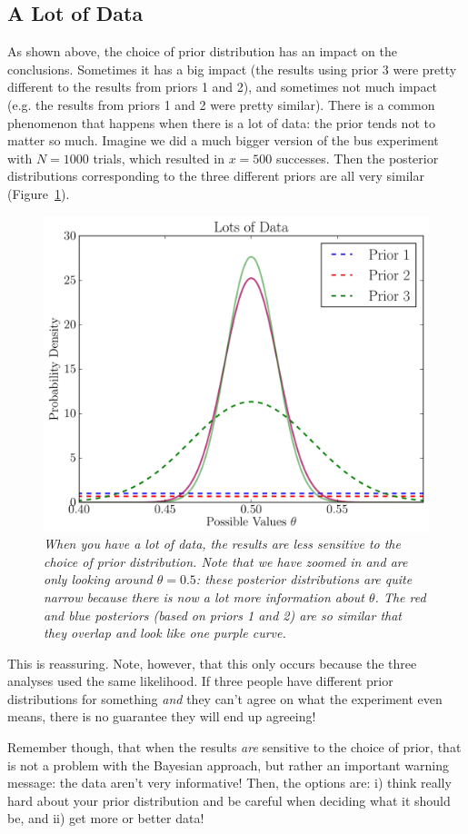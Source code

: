 \subsection{A Lot of Data}
As shown above, the choice of prior distribution has an impact on the conclusions. Sometimes
it has a big impact (the results using prior 3 were pretty different to the results
from priors 1 and 2), and sometimes not much impact (e.g. the results from
priors 1 and 2 were pretty similar). There is a common phenomenon that happens
when there is a lot of data: the prior tends not to matter so much. Imagine
we did a much bigger version of the bus experiment with $N=1000$ trials, which
resulted in $x=500$ successes. Then the posterior distributions corresponding
to the three different priors are all very similar (Figure~\ref{fig:lots_of_data}).

\begin{figure}[ht!]
\begin{center}
\includegraphics[scale=0.6]{Figures/lots_of_data.pdf}
\caption{\it When you have a lot of data, the results are less sensitive
to the choice of prior distribution. Note that we have zoomed in and are only
looking around $\theta=0.5$: these posterior distributions are quite narrow
because there is now a lot more information about $\theta$. The red and blue
posteriors (based on priors 1 and 2) are so similar that they overlap and look
like one purple curve.\label{fig:lots_of_data}}
\end{center}
\end{figure}

This is reassuring. Note, however, that this only occurs because the three
analyses used the same likelihood. If three people have different prior
distributions for something {\it and} they can't agree on what the experiment
even means, there is no guarantee they will end up agreeing!

Remember though, that when the results {\it are} sensitive
to the choice of prior, that is not a problem with the Bayesian approach, but
rather an important warning message: the data aren't very
informative! Then, the options are: i) think really hard about your prior
distribution and be careful when deciding what it should be, and ii) get more or
better data!

